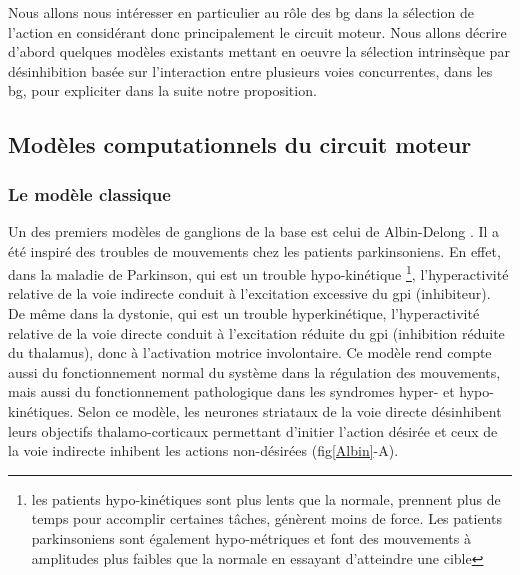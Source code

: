 Nous allons nous intéresser en particulier au rôle des \gls{bg} dans la sélection de l'action en considérant donc principalement le circuit moteur. Nous allons décrire d'abord quelques modèles existants mettant en oeuvre la sélection intrinsèque par désinhibition basée sur l'interaction entre plusieurs voies concurrentes, dans les \gls{bg}, pour expliciter dans la suite notre proposition.\\ 

\subsection{ Modèles computationnels du circuit moteur}

\subsubsection{Le modèle classique}

Un des premiers modèles de ganglions de la base est celui de Albin-Delong \cite{Albin:1989, DeLong:1990}. Il a été inspiré des troubles de mouvements chez les patients parkinsoniens. En effet, dans la maladie de Parkinson, qui est un trouble hypo-kinétique \footnote{les patients hypo-kinétiques sont plus lents que la normale, prennent plus de temps pour accomplir certaines tâches, génèrent moins de force. Les patients parkinsoniens sont également hypo-métriques et font des mouvements à amplitudes plus faibles que la normale en essayant d'atteindre une cible}, l'hyperactivité relative de la voie indirecte conduit à l'excitation excessive du \gls{gpi} (inhibiteur). De même dans la dystonie, qui est un trouble hyperkinétique, l'hyperactivité relative de la voie directe conduit à l'excitation réduite du \gls{gpi} (inhibition réduite du thalamus), donc à l'activation motrice involontaire. Ce modèle rend compte aussi du fonctionnement normal du système dans la régulation des mouvements, mais aussi du fonctionnement pathologique dans les syndromes hyper- et hypo-kinétiques. Selon ce modèle, les neurones striataux de la voie directe désinhibent leurs objectifs thalamo-corticaux permettant d'initier l'action désirée et ceux de la voie indirecte inhibent les actions non-désirées (fig\ref{Albin}-A).\\

